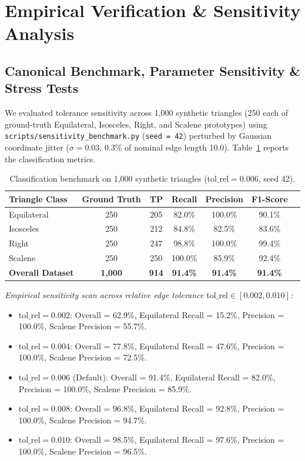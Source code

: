 \documentclass[preprint,12pt]{elsarticle}
\begin{document}
\section{Empirical Verification \& Sensitivity Analysis}

\subsection{Canonical Benchmark, Parameter Sensitivity \& Stress Tests}
We evaluated tolerance sensitivity across 1,000 synthetic triangles (250 each of ground-truth Equilateral, Isosceles, Right, and Scalene prototypes) using \texttt{scripts/sensitivity\_benchmark.py} (\texttt{seed = 42}) perturbed by Gaussian coordinate jitter ($\sigma = 0.03$, 0.3\% of nominal edge length 10.0). Table~\ref{tab:benchmark} reports the classification metrics.

\begin{table}[h!]
\centering
\small
\begin{tabular}{lcccccc}
\toprule
\textbf{Triangle Class} & \textbf{Ground Truth} & \textbf{TP} & \textbf{Recall} & \textbf{Precision} & \textbf{F1-Score} \\
\midrule
Equilateral & 250 & 205 & 82.0\% & 100.0\% & 90.1\% \\
Isosceles & 250 & 212 & 84.8\% & 82.5\% & 83.6\% \\
Right & 250 & 247 & 98.8\% & 100.0\% & 99.4\% \\
Scalene & 250 & 250 & 100.0\% & 85.9\% & 92.4\% \\
\midrule
\textbf{Overall Dataset} & \textbf{1,000} & \textbf{914} & \textbf{91.4\%} & \textbf{91.4\%} & \textbf{91.4\%} \\
\bottomrule
\end{tabular}
\caption{Classification benchmark on 1,000 synthetic triangles ($\text{tol\_rel} = 0.006$, seed 42).}
\label{tab:benchmark}
\end{table}

\textit{Empirical sensitivity scan across relative edge tolerance $\text{tol\_rel} \in [0.002, 0.010]$:}
\begin{itemize}
    \item $\text{tol\_rel} = 0.002$: Overall = 62.9\%, Equilateral Recall = 15.2\%, Precision = 100.0\%, Scalene Precision = 55.7\%.
    \item $\text{tol\_rel} = 0.004$: Overall = 77.8\%, Equilateral Recall = 47.6\%, Precision = 100.0\%, Scalene Precision = 72.5\%.
    \item $\text{tol\_rel} = 0.006$ (Default): Overall = 91.4\%, Equilateral Recall = 82.0\%, Precision = 100.0\%, Scalene Precision = 85.9\%.
    \item $\text{tol\_rel} = 0.008$: Overall = 96.8\%, Equilateral Recall = 92.8\%, Precision = 100.0\%, Scalene Precision = 94.7\%.
    \item $\text{tol\_rel} = 0.010$: Overall = 98.5\%, Equilateral Recall = 97.6\%, Precision = 100.0\%, Scalene Precision = 96.5\%.
\end{itemize}
\end{document}
